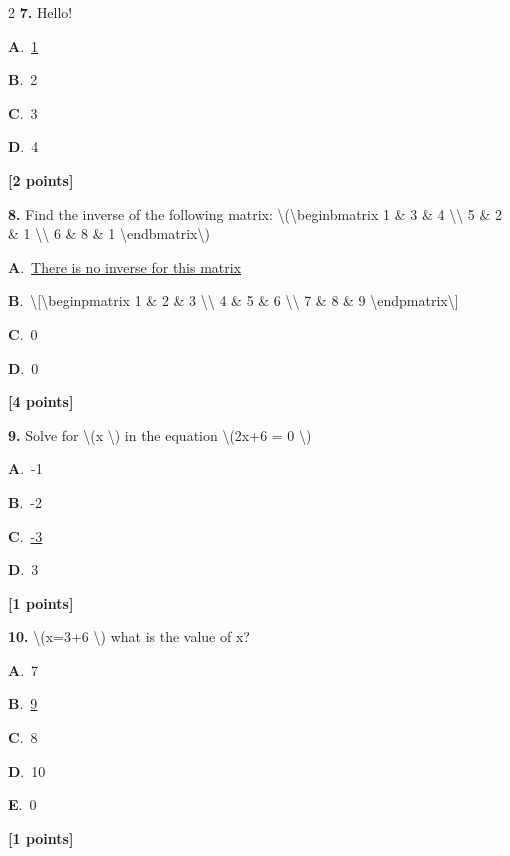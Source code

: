 \documentclass[12pt]{article}
\newcommand{\choice}[3]{%
  \noindent\textbf{#1}.~#2\hfill#3\par\vspace{0.25em}
}
\begin{document}
\begin{multicols}{2}
\noindent \textbf{\textenglish{7.}} {\textenglish{Hello!}}

\noindent\choice{A}{\underline{{\textenglish{1}}}}{}
\noindent\choice{B}{{\textenglish{2}}}{}
\noindent\choice{C}{{\textenglish{3}}}{}
\noindent\choice{D}{{\textenglish{4}}}{}
\hfill \textbf{[2 points]}\vspace{0.5em}

\noindent \textbf{\textenglish{8.}} {\textenglish{Find the inverse of the following matrix: \textbackslash{}(\textbackslash{}begin{bmatrix} 1 \& 3 \& 4 \textbackslash{}\textbackslash{} 5 \& 2 \& 1 \textbackslash{}\textbackslash{} 6 \& 8 \& 1 \textbackslash{}end{bmatrix}\textbackslash{})}}

\noindent\choice{A}{\underline{{\textenglish{There is no inverse for this matrix}}}}{}
\noindent\choice{B}{{\textenglish{\textbackslash{}[\textbackslash{}begin{pmatrix} 1 \& 2 \& 3 \textbackslash{}\textbackslash{} 4 \& 5 \& 6 \textbackslash{}\textbackslash{} 7 \& 8 \& 9  \textbackslash{}end{pmatrix}\textbackslash{}]}}}{}
\noindent\choice{C}{{\textenglish{0}}}{}
\noindent\choice{D}{{\textenglish{0}}}{}
\hfill \textbf{[4 points]}\vspace{0.5em}

\noindent \textbf{\textenglish{9.}} {\textenglish{Solve for \textbackslash{}(x \textbackslash{}) in the equation \textbackslash{}(2x+6 = 0 \textbackslash{})}}

\noindent\choice{A}{{\textenglish{-1}}}{}
\noindent\choice{B}{{\textenglish{-2}}}{}
\noindent\choice{C}{\underline{{\textenglish{-3}}}}{}
\noindent\choice{D}{{\textenglish{3}}}{}
\hfill \textbf{[1 points]}\vspace{0.5em}

\noindent \textbf{\textenglish{10.}} {\textenglish{\textbackslash{}(x=3+6 \textbackslash{}) what is the value of x?}}

\noindent\choice{A}{{\textenglish{7}}}{}
\noindent\choice{B}{\underline{{\textenglish{9}}}}{}
\noindent\choice{C}{{\textenglish{8}}}{}
\noindent\choice{D}{{\textenglish{10}}}{}
\noindent\choice{E}{{\textenglish{0}}}{}
\hfill \textbf{[1 points]}\vspace{0.5em}


\end{multicols}
\end{document}
